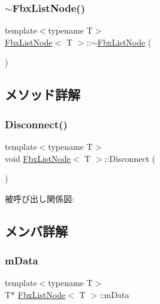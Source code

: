 \mbox{\label{class_fbx_list_node_aab6a6fce53b6e3928489c2a9eb91d7ff}} 
\subsubsection{\texorpdfstring{$\sim$\+Fbx\+List\+Node()}{~FbxListNode()}}
{\footnotesize\ttfamily template$<$typename T$>$ \\
\hyperlink{class_fbx_list_node}{Fbx\+List\+Node}$<$ T $>$\+::$\sim$\hyperlink{class_fbx_list_node}{Fbx\+List\+Node} (\begin{DoxyParamCaption}{ }\end{DoxyParamCaption})}



\subsection{メソッド詳解}
\mbox{\label{class_fbx_list_node_a8efc990a61791021842291e449c0c6df}} 
\subsubsection{\texorpdfstring{Disconnect()}{Disconnect()}}
{\footnotesize\ttfamily template$<$typename T$>$ \\
void \hyperlink{class_fbx_list_node}{Fbx\+List\+Node}$<$ T $>$\+::Disconnect (\begin{DoxyParamCaption}{ }\end{DoxyParamCaption})}

被呼び出し関係図\+:


\subsection{メンバ詳解}
\mbox{\label{class_fbx_list_node_a4cf8e0064fee22cafa5a3a8330777c57}} 
\subsubsection{\texorpdfstring{m\+Data}{mData}}
{\footnotesize\ttfamily template$<$typename T$>$ \\
T$\ast$ \hyperlink{class_fbx_list_node}{Fbx\+List\+Node}$<$ T $>$\+::m\+Data}


